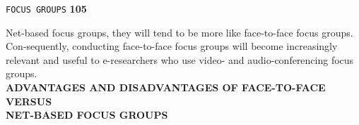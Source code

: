 \documentclass{book}
\begin{document}
\newpage
\begin{flushright}
 \texttt{FOCUS GROUPS} \hspace*{1cm} \textbf{105}
\end{flushright}

\vspace*{1cm}
Net-based focus groups, they will tend to be more like face-to-face focus groups. Con-sequently, conducting face-to-face focus groups will become increasingly relevant and useful to e-researchers who use video- and audio-conferencing focus groups.\\

\vspace*{0.5cm}
\large{
\textbf{ADVANTAGES AND DISADVANTAGES OF FACE-TO-FACE VERSUS\\
NET-BASED FOCUS GROUPS \\}
}
\end{document}
